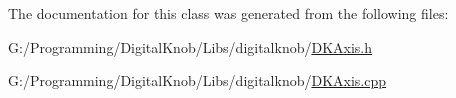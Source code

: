 The documentation for this class was generated from the following files\-:\begin{DoxyCompactItemize}
\item 
G\-:/\-Programming/\-Digital\-Knob/\-Libs/digitalknob/\hyperlink{_d_k_axis_8h}{D\-K\-Axis.\-h}\item 
G\-:/\-Programming/\-Digital\-Knob/\-Libs/digitalknob/\hyperlink{_d_k_axis_8cpp}{D\-K\-Axis.\-cpp}\end{DoxyCompactItemize}
